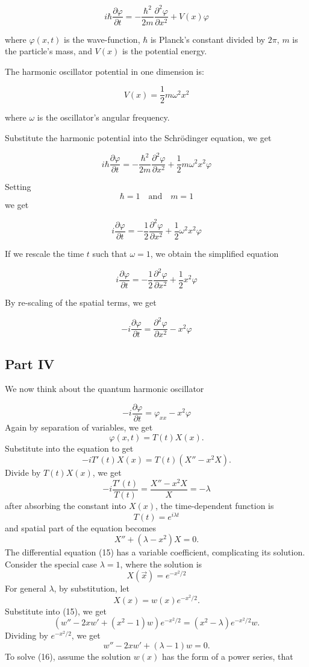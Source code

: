 \documentclass[a4paper,12pt]{report}
\begin{document}
\[
i \hbar \frac{\partial \varphi}{\partial t} = -\frac{\hbar^2}{2m} \frac{\partial^2 \varphi}{\partial x^2} + V(x)\varphi
\]

where \(\varphi(x, t)\) is the wave-function, \(\hbar\) is Planck's constant divided by \(2\pi\), \(m\) is the particle's mass, and \(V(x)\) is the potential energy.

The harmonic oscillator potential in one dimension is:  

\[
V(x) = \frac{1}{2} m \omega^2 x^2
\]

where \(\omega\) is the oscillator's angular frequency.

Substitute the harmonic potential into the Schrödinger equation, we get

\[
i \hbar \frac{\partial \varphi}{\partial t} = -\frac{\hbar^2}{2m} \frac{\partial^2 \varphi}{\partial x^2} + \frac{1}{2}m \omega^2 x^2 \varphi
\]

Setting
\[
\hbar = 1 \quad \text{and} \quad m = 1
\]
we get

\[
i \frac{\partial \varphi}{\partial t} = -\frac{1}{2} \frac{\partial^2 \varphi}{\partial x^2} + \frac{1}{2} \omega^2 x^2 \varphi
\]

If we rescale the time \(t\) such that \(\omega = 1\), we obtain the simplified equation

\[
i \frac{\partial \varphi}{\partial t} = -\frac{1}{2} \frac{\partial^2 \varphi}{\partial x^2} + \frac{1}{2} x^2 \varphi
\]

By re-scaling of the spatial terms, we get

\[
-i \frac{\partial \varphi}{\partial t} = \frac{\partial^2 \varphi}{\partial x^2} - x^2 \varphi
\]
\subsection{Part IV}
\hspace*{1.5em}We now think about the quantum harmonic oscillator

\[
-i \frac{\partial \varphi}{\partial t} = \varphi_{xx} - x^2 \varphi
\]
Again by separation of variables, we get
\[
\varphi(x, t) = T(t)X(x).
\]
Substitute into the equation to get
\[
-i T'(t) X(x) = T(t)(X'' - x^2 X).
\]
Divide by $T(t)X(x)$, we get
\[
-i \frac{T'(t)}{T(t)} = \frac{X'' - x^2 X}{X} = -\lambda \tag{14}
\]
after absorbing the constant into \(X(x)\), the time-dependent function is
\[
T(t) = e^{i\lambda t}
\]
and spatial part of the equation becomes
\[
X'' + (\lambda - x^2)X = 0. \tag{15}
\]
The differential equation (15) has a variable coefficient, complicating its solution. Consider the special case $\lambda = 1$, where the solution is
\[
X(\vec{x}) = e^{-x^2/2}
\]
For general $\lambda$, by substitution, let
\[
X(x) = w(x)e^{-x^2/2}.
\]
Substitute into (15), we get
\[
\left(w'' - 2xw' + (x^2 - 1)w\right)e^{-x^2/2} = (x^2 - \lambda)e^{-x^2/2}w.
\]
Dividing by $e^{-x^2/2}$, we get
\[
w'' - 2xw' + (\lambda - 1)w = 0. \tag{16}
\]
To solve (16), assume the solution \(w(x)\) has the form of a power series, that
\end{document}
